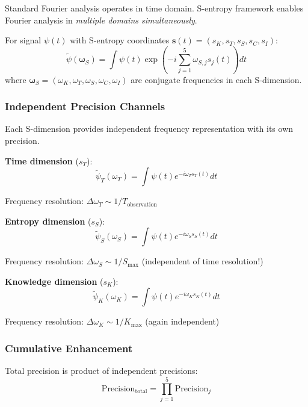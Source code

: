 \documentclass[11pt,onecolumn]{article}
\begin{document}
Standard Fourier analysis operates in time domain. S-entropy framework enables Fourier analysis in \textit{multiple domains simultaneously}.

\begin{definition}
For signal $\psi(t)$ with S-entropy coordinates $\mathbf{s}(t) = (s_K, s_T, s_S, s_C, s_I)$:
\begin{equation}
\tilde{\psi}(\boldsymbol{\omega}_S) = \int \psi(t) \exp\left(-i\sum_{j=1}^{5} \omega_{S,j} s_j(t)\right) dt
\end{equation}
where $\boldsymbol{\omega}_S = (\omega_K, \omega_T, \omega_S, \omega_C, \omega_I)$ are conjugate frequencies in each S-dimension.
\end{definition}

\subsubsection{Independent Precision Channels}

Each S-dimension provides independent frequency representation with its own precision.

\textbf{Time dimension} ($s_T$):
\begin{equation}
\tilde{\psi}_T(\omega_T) = \int \psi(t) e^{-i\omega_T s_T(t)} dt
\end{equation}

Frequency resolution: $\Delta \omega_T \sim 1/T_{\text{observation}}$

\textbf{Entropy dimension} ($s_S$):
\begin{equation}
\tilde{\psi}_S(\omega_S) = \int \psi(t) e^{-i\omega_S s_S(t)} dt
\end{equation}

Frequency resolution: $\Delta \omega_S \sim 1/S_{\text{max}}$ (independent of time resolution!)

\textbf{Knowledge dimension} ($s_K$):
\begin{equation}
\tilde{\psi}_K(\omega_K) = \int \psi(t) e^{-i\omega_K s_K(t)} dt
\end{equation}

Frequency resolution: $\Delta \omega_K \sim 1/K_{\text{max}}$ (again independent)

\subsubsection{Cumulative Enhancement}

Total precision is product of independent precisions:
\begin{equation}
\text{Precision}_{\text{total}} = \prod_{j=1}^{5} \text{Precision}_j
\end{equation}
\end{document}
